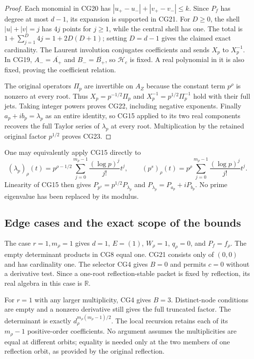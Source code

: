 \begin{proof}
Each monomial in CG20 has
$|u_+-u_-|+|v_+-v_-|\le k$.
Since $P_f$ has degree at most $d-1$, its expansion is supported
in CG21. For $D\ge0$, the shell $|u|+|v|=j$ has $4j$ points
for $j\ge1$, while the central shell has one. The total is
$1+\sum_{j=1}^D4j=1+2D(D+1)$; setting $D=d-1$ gives the
claimed exact cardinality. The Laurent involution conjugates
coefficients and sends $X_p$ to $X_p^{-1}$.
In CG19, $A_- =\overline{A_+}$ and
$B_-=\overline{B_+}$, so $\mathcal H_c$ is fixed.
A real polynomial in it is also fixed, proving the coefficient
relation.

The original operators $\Pi_p$ are invertible on $A_Z$ because
the constant term $p^\rho$ is nonzero at every root.
Thus $X_p=p^{-1/2}\Pi_p$ and
$X_p^{-1}=p^{1/2}\Pi_p^{-1}$ hold with their full jets.
Taking integer powers proves CG22, including negative exponents.
Finally $a_p+ib_p=\lambda_p$ as an entire identity, so CG15
applied to its two real components recovers the full Taylor
series of $\lambda_p$ at every root. Multiplication by the
retained original factor $p^{1/2}$ proves CG23.
\end{proof}

One may equivalently apply CG15 directly to
\begin{equation}
 (\lambda_p)_\rho(t)=p^{\rho-1/2}
              \sum_{j=0}^{m_\rho-1}\frac{(\log p)^j}{j!}t^j,
 \qquad
 (p^s)_\rho(t)=p^{\rho}
              \sum_{j=0}^{m_\rho-1}\frac{(\log p)^j}{j!}t^j.
 \tag{CG24}\label{cg:other-prime-jets}
\end{equation}
Linearity of CG15 then gives
$P_{p^s}=p^{1/2}P_{\lambda_p}$ and
$P_{\lambda_p}=P_{a_p}+iP_{b_p}$.
No prime eigenvalue has been replaced by its modulus.

\subsection{Edge cases and the exact scope of the bounds}

The case $r=1,m_\rho=1$ gives $d=1$, $E=(1)$,
$W_\rho=1$, $q_\rho=0$, and $P_f=f_\rho$.
The empty determinant products in CG8 equal one.
CG21 consists only of $(0,0)$ and has cardinality one.
The selector CG4 gives $B=0$ and permits $c=0$ without a
derivative test.
Since a one-root reflection-stable packet is fixed by reflection,
its real algebra in this case is $\mathbb{R}$.

For $r=1$ with any larger multiplicity, CG4 gives $B=3$.
Distinct-node conditions
are empty and a nonzero derivative still gives the full truncated
factor. The determinant is exactly
$d_\rho^{m_\rho(m_\rho-1)/2}$. The local recursion retains each
of its $m_\rho-1$ positive-order coefficients.
No argument assumes the multiplicities are equal at different
orbits; equality is needed only at the two members of one
reflection orbit, as provided by the original reflection.

